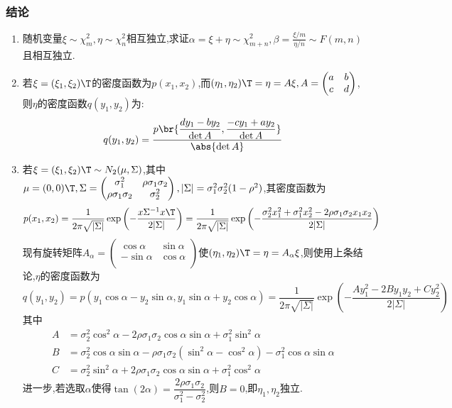 \documentclass{article}
\theoremstyle{definition}
\begin{document}
\subsubsection{结论}
\begin{enumerate}
    \item 随机变量$\xi\sim\chi^2_m,\eta\sim\chi^2_n$相互独立,求证$\alpha=\xi+\eta\sim\chi^2_{m+n},\beta=\frac{\xi/m}{\eta/n}\sim F(m,n)$且相互独立.
    \item 若$\xi=(\xi_1,\xi_2)\T$的密度函数为$p(x_1,x_2)$,而$(\eta_1,\eta_2)\T=\eta=A\xi, A=\begin{pmatrix}a&b\\c&d\\ \end{pmatrix}$,则$\eta$的密度函数$q(y_1,y_2)$为:
    $$q(y_1,y_2)=\frac{p\br{\dfrac{dy_1-by_2}{\det A},\dfrac{-cy_1+ay_2}{\det A}}}{\abs{\det A}}$$
    \item 若$\xi=(\xi_1,\xi_2)\T\sim N_2(\mu,\Sigma)$,其中$\mu=(0,0)\T,\Sigma=\begin{pmatrix}\sigma_1^2&\rho\sigma_1\sigma_2\\\rho\sigma_1\sigma_2&\sigma_2^2\\ \end{pmatrix}, |\Sigma|=\sigma_1^2\sigma_2^2(1-\rho^2)$,其密度函数为
    $$p(x_1,x_2)=\frac{1}{2\pi\sqrt{|\Sigma|}}\exp\left(-\frac{x\Sigma^{-1}x\T}{2|\Sigma|}\right)=\frac{1}{2\pi\sqrt{|\Sigma|}}\exp\left(-\frac{\sigma_2^2 x_1^2+\sigma_1^2 x_2^2-2\rho\sigma_1 \sigma_2 x_1 x_2}{2|\Sigma|}\right)$$
    现有旋转矩阵$A_\alpha=\begin{pmatrix}\cos\alpha&\sin\alpha\\-\sin\alpha&\cos\alpha\\ \end{pmatrix}$使$(\eta_1,\eta_2)\T=\eta=A_\alpha \xi$,则使用上条结论,$\eta$的密度函数为
    $$q(y_1,y_2)=p(y_1\cos\alpha-y_2\sin\alpha,y_1\sin\alpha+y_2\cos\alpha)=\frac{1}{2\pi \sqrt{|\Sigma|}}\exp\left(-\frac{Ay_1^2-2By_1y_2+Cy_2^2}{2|\Sigma|}\right)$$
    其中$$\begin{aligned}
        A&=\sigma_2^2\cos^2\alpha-2\rho\sigma_1\sigma_2\cos\alpha\sin\alpha+\sigma_1^2\sin^2\alpha\\
        B&=\sigma_2^2\cos\alpha\sin\alpha-\rho\sigma_1\sigma_2(\sin^2\alpha-\cos^2\alpha)-\sigma^2_1\cos\alpha\sin\alpha\\
        C&=\sigma_2^2\sin^2\alpha+2\rho\sigma_1\sigma_2\cos\alpha\sin\alpha+\sigma_1^2\cos^2\alpha
    \end{aligned}$$
    进一步,若选取$\alpha$使得$\tan(2\alpha)=\dfrac{2\rho\sigma_1\sigma_2}{\sigma_1^2-\sigma_2^2}$,则$B=0$,即$\eta_1,\eta_2$独立.
\end{enumerate}
\end{document}

